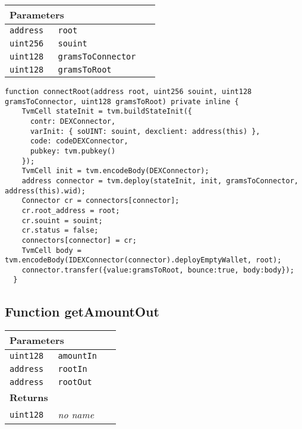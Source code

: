 \ifsoltables
\noindent\begin{tabular}{|l|l|p{5cm}|}\hline
\multicolumn{3}{|l|}{\bf Parameters}\\\hline
\tt address & \tt root &\\\hline
\tt uint256 & \tt souint &\\\hline
\tt uint128 & \tt gramsToConnector &\\\hline
\tt uint128 & \tt gramsToRoot &\\\hline
\end{tabular}
\fi

\vspace{2cm}

\begin{lstlisting}[firstnumber=113]
  function connectRoot(address root, uint256 souint, uint128 gramsToConnector, uint128 gramsToRoot) private inline {
    TvmCell stateInit = tvm.buildStateInit({
      contr: DEXConnector,
      varInit: { soUINT: souint, dexclient: address(this) },
      code: codeDEXConnector,
      pubkey: tvm.pubkey()
    });
    TvmCell init = tvm.encodeBody(DEXConnector);
    address connector = tvm.deploy(stateInit, init, gramsToConnector, address(this).wid);
    Connector cr = connectors[connector];
    cr.root_address = root;
    cr.souint = souint;
    cr.status = false;
    connectors[connector] = cr;
    TvmCell body = tvm.encodeBody(IDEXConnector(connector).deployEmptyWallet, root);
    connector.transfer({value:gramsToRoot, bounce:true, body:body});
  }
\end{lstlisting}

\subsection{Function getAmountOut}


\ifsoltables
\noindent\begin{tabular}{|l|l|p{5cm}|}\hline
\multicolumn{3}{|l|}{\bf Parameters}\\\hline
\tt uint128 & \tt amountIn &\\\hline
\tt address & \tt rootIn &\\\hline
\tt address & \tt rootOut &\\\hline
\multicolumn{3}{|l|}{\bf Returns}\\\hline
\tt uint128 & {\em no name} &\\\hline
\end{tabular}
\fi

\vspace{2cm}

